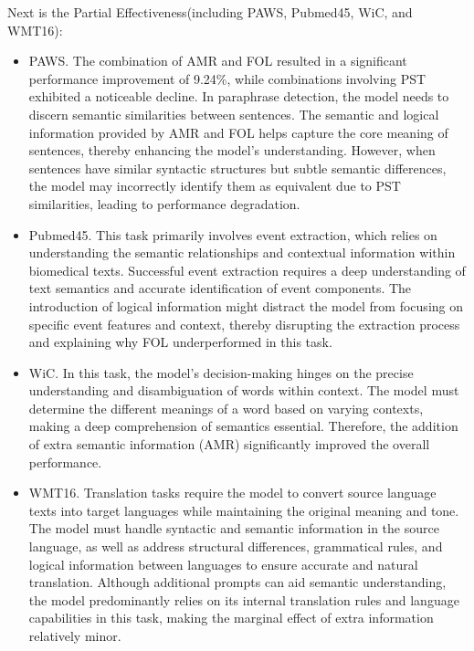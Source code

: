 Next is the Partial Effectiveness(including PAWS, Pubmed45, WiC, and WMT16):
\begin{itemize}
  \item PAWS. The combination of AMR and FOL resulted in a significant performance improvement of 9.24\%, while combinations involving PST exhibited a noticeable decline. In paraphrase detection, the model needs to discern semantic similarities between sentences. The semantic and logical information provided by AMR and FOL helps capture the core meaning of sentences, thereby enhancing the model’s understanding. However, when sentences have similar syntactic structures but subtle semantic differences, the model may incorrectly identify them as equivalent due to PST similarities, leading to performance degradation.
  \item Pubmed45. This task primarily involves event extraction, which relies on understanding the semantic relationships and contextual information within biomedical texts. Successful event extraction requires a deep understanding of text semantics and accurate identification of event components. The introduction of logical information might distract the model from focusing on specific event features and context, thereby disrupting the extraction process and explaining why FOL underperformed in this task.
  \item WiC. In this task, the model's decision-making hinges on the precise understanding and disambiguation of words within context. The model must determine the different meanings of a word based on varying contexts, making a deep comprehension of semantics essential. Therefore, the addition of extra semantic information (AMR) significantly improved the overall performance.
  \item WMT16. Translation tasks require the model to convert source language texts into target languages while maintaining the original meaning and tone. The model must handle syntactic and semantic information in the source language, as well as address structural differences, grammatical rules, and logical information between languages to ensure accurate and natural translation. Although additional prompts can aid semantic understanding, the model predominantly relies on its internal translation rules and language capabilities in this task, making the marginal effect of extra information relatively minor.
\end{itemize}

